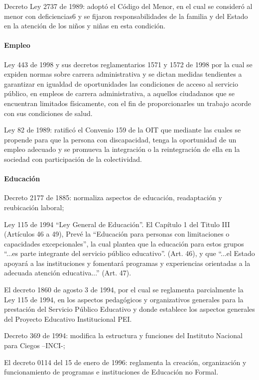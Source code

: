 \documentclass[a4paper, 12pt, oneside]{article}
\begin{document}
	Decreto Ley 2737 de 1989: adoptó el Código del Menor, en el cual se consideró al menor con deficiencias6 y se fijaron responsabilidades de la familia y del Estado en la atención de los niños y niñas en esta condición.

	\paragraph{Empleo}

	Ley 443 de 1998 y sus decretos reglamentarios 1571 y 1572 de 1998 por la cual se
	expiden normas sobre carrera administrativa y se dictan medidas tendientes a
	garantizar en igualdad de oportunidades las condiciones de acceso al servicio público,
	en empleos de carrera administrativa, a aquellos ciudadanos que se encuentran
	limitados físicamente, con el fin de proporcionarles un trabajo acorde con sus
	condiciones de salud.

	Ley 82 de 1989: ratificó el Convenio 159 de la OIT que mediante las cuales se propende
	para que la persona con discapacidad, tenga la oportunidad de un empleo adecuado y
	se promueva la integración o la reintegración de ella en la sociedad con participación
	de la colectividad.

	\paragraph{Educación}

	Decreto 2177 de 1885: normaliza aspectos de educación, readaptación y reubicación laboral;

	Ley 115 de 1994 “Ley General de Educación”. El Capítulo 1 del Titulo III (Artículos 46 a 49), Prevé la “Educación para personas con limitaciones o capacidades excepcionales”, la cual plantea que la educación para estos grupos “...es parte integrante del servicio público educativo”. (Art. 46), y que “...el Estado apoyará a las instituciones y fomentará programas y experiencias orientadas a la adecuada atención educativa...” (Art. 47).

	El decreto 1860 de agosto 3 de 1994, por el cual se reglamenta parcialmente la Ley 115 de 1994, en los aspectos pedagógicos y organizativos generales para la prestación del Servicio Público Educativo y donde establece los aspectos generales del Proyecto Educativo Institucional PEI.

	Decreto 369 de 1994: modifica la estructura y funciones del Instituto Nacional para Ciegos –INCI-;

	El decreto 0114 del 15 de enero de 1996: reglamenta la creación, organización y funcionamiento de programas e instituciones de Educación no Formal.
\end{document}
